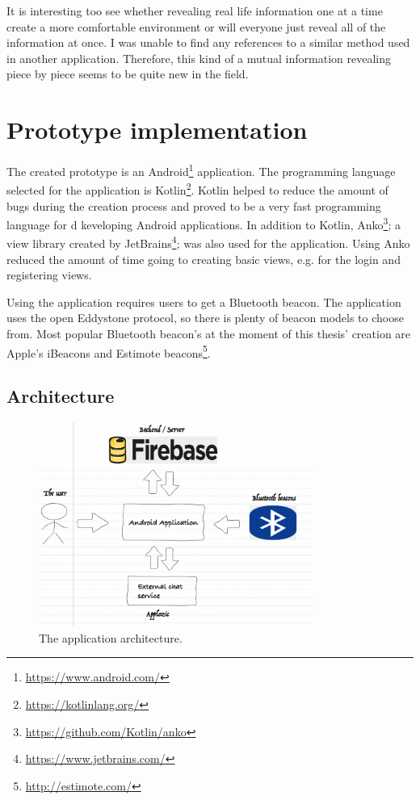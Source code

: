 It is interesting too see whether revealing real life information one at a time create a more comfortable environment or will everyone just reveal all of the information at once. I was unable to find any references to a similar method used in another application. Therefore, this kind of a mutual information revealing piece by piece seems to be quite new in the field.

\section{Prototype implementation}

The created prototype is an Android\footnote{\url{https://www.android.com/}} application. The programming language selected for the application is Kotlin\footnote{\url{https://kotlinlang.org/}}. Kotlin helped to reduce the amount of bugs during the creation process and proved to be a very fast programming language for d	keveloping Android applications. In addition to Kotlin, Anko\footnote{\url{https://github.com/Kotlin/anko}}; a view library created by JetBrains\footnote{\url{https://www.jetbrains.com/}}; was also used for the application. Using Anko reduced the amount of time going to creating basic views, e.g. for the login and registering views.

Using the application requires users to get a Bluetooth beacon. The application uses the open  Eddystone protocol, so there is plenty of beacon models to choose from. Most popular Bluetooth beacon's at the moment of this thesis' creation are Apple's iBeacons and Estimote beacons\footnote{\url{http://estimote.com/}}.

\subsection{Architecture}

\begin{figure}[htb]
	\begin{center}
		\includegraphics[width=0.8\textwidth]{fs_architecture.png}
		\caption{The application architecture.}	
	\end{center}
\end{figure}

